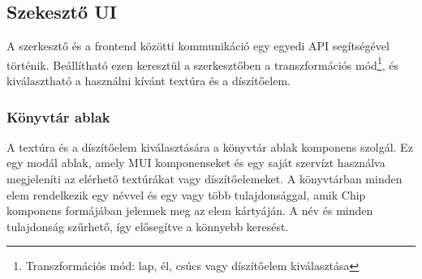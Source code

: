 \subsection{Szekesztő UI}
A szerkesztő és a frontend közötti kommunikáció egy egyedi API segítségével történik. Beállítható ezen keresztül a szerkesztőben a transzformációs mód\footnote{Transzformációs mód: lap, él, csúcs vagy díszítőelem kiválasztása}, és kiválasztható a használni kívánt textúra és a díszítőelem.

\subsubsection{Könyvtár ablak}
A textúra és a díszítőelem kiválasztására a könyvtár ablak komponens szolgál. Ez egy modál ablak, amely MUI komponenseket és egy saját szervízt használva megjeleníti az elérhető textúrákat vagy díszítőelemeket. A könyvtárban minden elem rendelkezik egy névvel és egy vagy több tulajdonsággal, amik Chip komponens formájában jelennek meg az elem kártyáján. A név és minden tulajdonság szűrhető, így elősegítve a könnyebb keresést.

